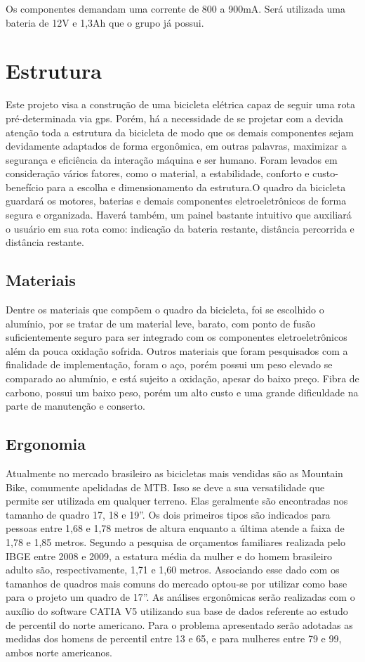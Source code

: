 Os componentes demandam uma corrente de 800 a 900mA. Será utilizada uma bateria de 12V e 1,3Ah que o grupo já possui.

  
  \section{Estrutura}
  Este projeto visa a construção de uma bicicleta elétrica capaz de seguir uma rota pré-determinada via gps. Porém, há a necessidade de se projetar com a devida atenção toda a estrutura da bicicleta de modo que os demais componentes sejam devidamente adaptados de forma ergonômica, em outras palavras, maximizar a segurança e eficiência da interação máquina e ser humano.
Foram levados em consideração vários fatores, como o material, a estabilidade, conforto e custo-benefício para a escolha e dimensionamento da estrutura.O quadro da bicicleta guardará os motores, baterias e demais componentes eletroeletrônicos de forma segura e organizada. Haverá também, um painel bastante intuitivo que auxiliará o usuário em sua rota como: indicação da bateria restante, distância percorrida e distância restante.
	
	\subsection{Materiais}
	Dentre os materiais que compõem o quadro da bicicleta, foi se escolhido o alumínio, por se tratar de um material leve, barato, com ponto de fusão suficientemente seguro para ser integrado com os componentes eletroeletrônicos além da pouca oxidação sofrida. Outros materiais que foram pesquisados com a finalidade de implementação, foram o aço, porém possui um peso elevado se comparado ao alumínio, e está sujeito a oxidação, apesar do baixo preço. Fibra de carbono, possui um baixo peso, porém um alto custo e uma grande dificuldade na parte de manutenção e conserto.
	
	\subsection{Ergonomia}
	Atualmente no mercado brasileiro as bicicletas mais vendidas são as Mountain Bike, comumente apelidadas de MTB. Isso se deve a sua versatilidade que permite ser utilizada em qualquer terreno. Elas geralmente são encontradas nos tamanho de quadro 17, 18 e 19”. Os dois primeiros tipos são indicados para pessoas entre 1,68 e 1,78 metros de altura enquanto a última atende a faixa de 1,78 e 1,85 metros. 
Segundo a pesquisa de orçamentos familiares realizada pelo IBGE entre 2008 e 2009, a estatura média da mulher e do homem brasileiro adulto são, respectivamente, 1,71 e 1,60 metros. Associando esse dado com os tamanhos de quadros mais comuns do mercado optou-se por utilizar como base para o projeto um quadro de 17”.  
As análises ergonômicas serão realizadas com o auxílio do software CATIA V5 utilizando sua base de dados referente ao estudo de percentil do norte americano. Para o problema apresentado serão adotadas as medidas dos homens de percentil entre 13 e 65, e para mulheres entre 79 e 99, ambos norte americanos.

